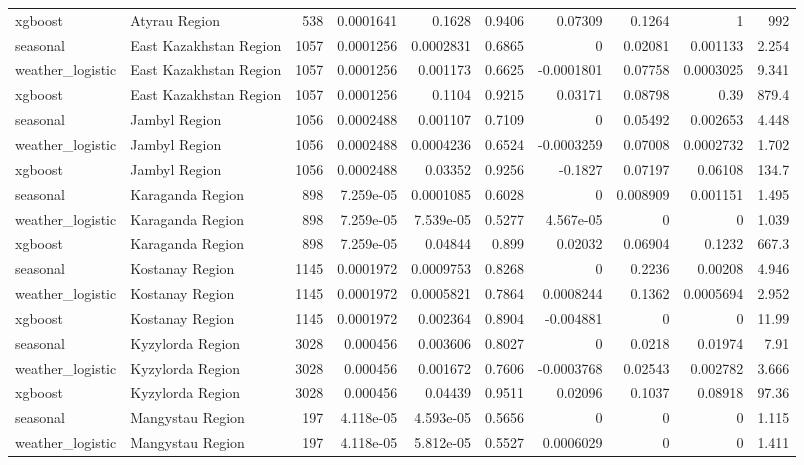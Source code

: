 \begin{table}
\begin{tabular}{llrrrrrrrr}
xgboost & Atyrau Region & 538 & 0.0001641 & 0.1628 & 0.9406 & 0.07309 & 0.1264 & 1 & 992 \\
seasonal & East Kazakhstan Region & 1057 & 0.0001256 & 0.0002831 & 0.6865 & 0 & 0.02081 & 0.001133 & 2.254 \\
weather_logistic & East Kazakhstan Region & 1057 & 0.0001256 & 0.001173 & 0.6625 & -0.0001801 & 0.07758 & 0.0003025 & 9.341 \\
xgboost & East Kazakhstan Region & 1057 & 0.0001256 & 0.1104 & 0.9215 & 0.03171 & 0.08798 & 0.39 & 879.4 \\
seasonal & Jambyl Region & 1056 & 0.0002488 & 0.001107 & 0.7109 & 0 & 0.05492 & 0.002653 & 4.448 \\
weather_logistic & Jambyl Region & 1056 & 0.0002488 & 0.0004236 & 0.6524 & -0.0003259 & 0.07008 & 0.0002732 & 1.702 \\
xgboost & Jambyl Region & 1056 & 0.0002488 & 0.03352 & 0.9256 & -0.1827 & 0.07197 & 0.06108 & 134.7 \\
seasonal & Karaganda Region & 898 & 7.259e-05 & 0.0001085 & 0.6028 & 0 & 0.008909 & 0.001151 & 1.495 \\
weather_logistic & Karaganda Region & 898 & 7.259e-05 & 7.539e-05 & 0.5277 & 4.567e-05 & 0 & 0 & 1.039 \\
xgboost & Karaganda Region & 898 & 7.259e-05 & 0.04844 & 0.899 & 0.02032 & 0.06904 & 0.1232 & 667.3 \\
seasonal & Kostanay Region & 1145 & 0.0001972 & 0.0009753 & 0.8268 & 0 & 0.2236 & 0.00208 & 4.946 \\
weather_logistic & Kostanay Region & 1145 & 0.0001972 & 0.0005821 & 0.7864 & 0.0008244 & 0.1362 & 0.0005694 & 2.952 \\
xgboost & Kostanay Region & 1145 & 0.0001972 & 0.002364 & 0.8904 & -0.004881 & 0 & 0 & 11.99 \\
seasonal & Kyzylorda Region & 3028 & 0.000456 & 0.003606 & 0.8027 & 0 & 0.0218 & 0.01974 & 7.91 \\
weather_logistic & Kyzylorda Region & 3028 & 0.000456 & 0.001672 & 0.7606 & -0.0003768 & 0.02543 & 0.002782 & 3.666 \\
xgboost & Kyzylorda Region & 3028 & 0.000456 & 0.04439 & 0.9511 & 0.02096 & 0.1037 & 0.08918 & 97.36 \\
seasonal & Mangystau Region & 197 & 4.118e-05 & 4.593e-05 & 0.5656 & 0 & 0 & 0 & 1.115 \\
weather_logistic & Mangystau Region & 197 & 4.118e-05 & 5.812e-05 & 0.5527 & 0.0006029 & 0 & 0 & 1.411 \\

\end{tabular}
\end{table}
